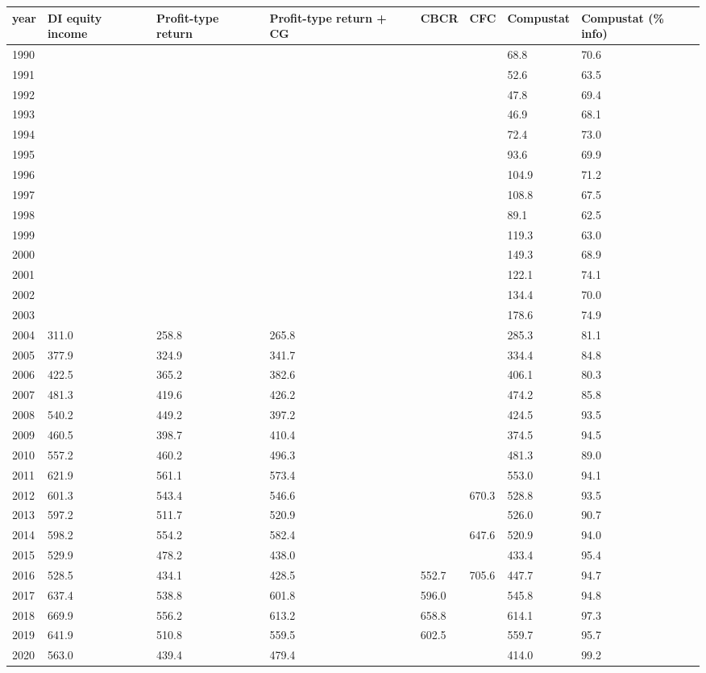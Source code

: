 \begin{tabular}{p{1.5cm}p{1.5cm}p{1.5cm}p{1.5cm}p{1.5cm}p{1.5cm}p{1.5cm}p{1.5cm}}
\toprule
year & DI equity income & Profit-type return & Profit-type return + CG & CBCR & CFC & Compustat & Compustat (\% info) \\
\midrule
1990 &  &  &  &  &  & 68.8 & 70.6 \\
1991 &  &  &  &  &  & 52.6 & 63.5 \\
1992 &  &  &  &  &  & 47.8 & 69.4 \\
1993 &  &  &  &  &  & 46.9 & 68.1 \\
1994 &  &  &  &  &  & 72.4 & 73.0 \\
1995 &  &  &  &  &  & 93.6 & 69.9 \\
1996 &  &  &  &  &  & 104.9 & 71.2 \\
1997 &  &  &  &  &  & 108.8 & 67.5 \\
1998 &  &  &  &  &  & 89.1 & 62.5 \\
1999 &  &  &  &  &  & 119.3 & 63.0 \\
2000 &  &  &  &  &  & 149.3 & 68.9 \\
2001 &  &  &  &  &  & 122.1 & 74.1 \\
2002 &  &  &  &  &  & 134.4 & 70.0 \\
2003 &  &  &  &  &  & 178.6 & 74.9 \\
2004 & 311.0 & 258.8 & 265.8 &  &  & 285.3 & 81.1 \\
2005 & 377.9 & 324.9 & 341.7 &  &  & 334.4 & 84.8 \\
2006 & 422.5 & 365.2 & 382.6 &  &  & 406.1 & 80.3 \\
2007 & 481.3 & 419.6 & 426.2 &  &  & 474.2 & 85.8 \\
2008 & 540.2 & 449.2 & 397.2 &  &  & 424.5 & 93.5 \\
2009 & 460.5 & 398.7 & 410.4 &  &  & 374.5 & 94.5 \\
2010 & 557.2 & 460.2 & 496.3 &  &  & 481.3 & 89.0 \\
2011 & 621.9 & 561.1 & 573.4 &  &  & 553.0 & 94.1 \\
2012 & 601.3 & 543.4 & 546.6 &  & 670.3 & 528.8 & 93.5 \\
2013 & 597.2 & 511.7 & 520.9 &  &  & 526.0 & 90.7 \\
2014 & 598.2 & 554.2 & 582.4 &  & 647.6 & 520.9 & 94.0 \\
2015 & 529.9 & 478.2 & 438.0 &  &  & 433.4 & 95.4 \\
2016 & 528.5 & 434.1 & 428.5 & 552.7 & 705.6 & 447.7 & 94.7 \\
2017 & 637.4 & 538.8 & 601.8 & 596.0 &  & 545.8 & 94.8 \\
2018 & 669.9 & 556.2 & 613.2 & 658.8 &  & 614.1 & 97.3 \\
2019 & 641.9 & 510.8 & 559.5 & 602.5 &  & 559.7 & 95.7 \\
2020 & 563.0 & 439.4 & 479.4 &  &  & 414.0 & 99.2 \\
\bottomrule
\end{tabular}
